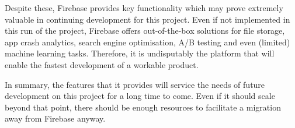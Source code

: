 Despite these, Firebase provides key functionality which may prove extremely valuable in continuing development for this project. Even if not implemented in this run of the project, Firebase offers out-of-the-box solutions for file storage, app crash analytics, search engine optimisation, A/B testing and even (limited) machine learning tasks. Therefore, it is undisputably the platform that will enable the fastest development of a workable product.

In summary, the features that it provides will service the needs of future development on this project for a long time to come. Even if it should scale beyond that point, there should be enough resources to facilitate a migration away from Firebase anyway.
